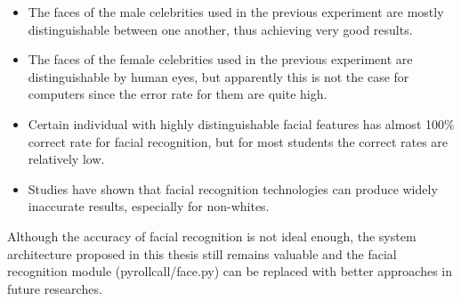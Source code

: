\begin{itemize}
  \item The faces of the male celebrities used in the previous experiment are mostly distinguishable between one another,
    thus achieving very good results.
  \item The faces of the female celebrities used in the previous experiment are distinguishable by human eyes, but apparently
    this is not the case for computers since the error rate for them are quite high.
  \item Certain individual with highly distinguishable facial features has almost 100\% correct rate for facial recognition,
    but for most students the correct rates are relatively low.
  \item Studies \cite{err-facial-recog-tech} have shown that facial recognition technologies can produce widely inaccurate results, especially for non-whites.
  \end{itemize}
\setstretch{\myContentLineSpacing}


Although the accuracy of facial recognition is not ideal enough, the system architecture proposed in this thesis
still remains valuable and the facial recognition module (pyrollcall/face.py) can be replaced with better approaches
in future researches.
\vspace{0.2cm}

